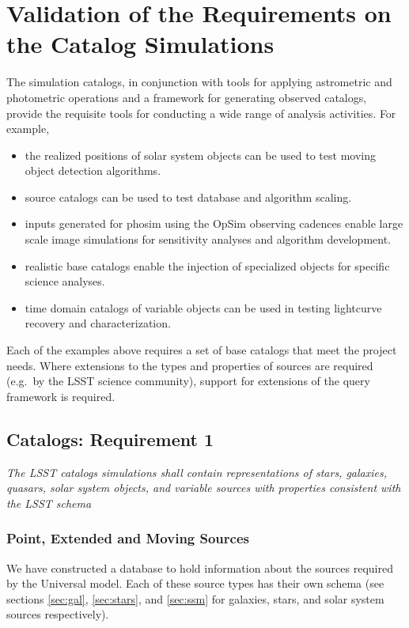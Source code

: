 \documentclass[]{article}
\begin{document}
\section{Validation of the Requirements on the Catalog Simulations}

The simulation catalogs, in conjunction with tools for applying
astrometric and photometric operations and a framework for generating
observed catalogs, provide the requisite tools for conducting a
wide range of analysis activities. For example,
\begin{itemize}
\item the realized positions of solar system objects can be used to
  test moving object detection algorithms.
\item source catalogs can be used to test database and algorithm scaling.
\item inputs generated for phosim using the OpSim observing cadences
  enable large scale image simulations for sensitivity analyses and
  algorithm development.
\item realistic base catalogs enable the injection of specialized objects for specific science
analyses.
\item time domain catalogs of variable objects can be used in testing
  lightcurve recovery and characterization.
\end{itemize}

Each of the examples above requires a set of base catalogs that meet
the project needs.  Where extensions to the types and properties of
sources are required (e.g.\ by the LSST science community), support for
extensions of the query framework is required.

\subsection{Catalogs: Requirement 1}

{\it The LSST catalogs simulations shall contain representations of
  stars, galaxies, quasars, solar system objects, and variable sources
  with properties consistent with the LSST schema}\\

\subsubsection{Point, Extended and Moving Sources}

We have constructed a database to hold information about the sources
required by the Universal model.  Each of these source types has their
own schema (see sections \ref{sec:gal}, \ref{sec:stars}, and
\ref{sec:ssm} for galaxies, stars, and solar system sources
respectively).
\end{document}
